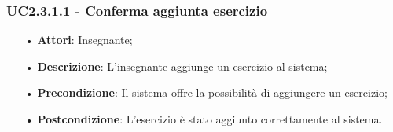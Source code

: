 \subsubsection{UC2.3.1.1 - Conferma aggiunta esercizio}
\begin{itemize}
	\item[•] \textbf{Attori}: Insegnante;
	\item[•] \textbf{Descrizione}: L'insegnante aggiunge un esercizio al sistema;
	\item[•] \textbf{Precondizione}: Il sistema offre la possibilità di aggiungere un esercizio;
	\item[•] \textbf{Postcondizione}: L’esercizio è stato aggiunto correttamente al sistema.
\end{itemize}


